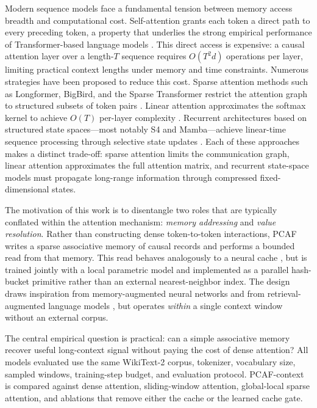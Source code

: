 \documentclass{article}
\begin{document}
Modern sequence models face a fundamental tension between memory access breadth
and computational cost. Self-attention grants each token a direct path to every
preceding token, a property that underlies the strong empirical performance of
Transformer-based language models
\citep{vaswani2017attention,bahdanau2015attention}. This direct access is
expensive: a causal attention layer over a length-$T$ sequence requires
$O(T^2 d)$ operations per layer, limiting practical context lengths under
memory and time constraints. Numerous strategies have been proposed to reduce
this cost. Sparse attention methods such as Longformer, BigBird, and the Sparse
Transformer restrict the attention graph to structured subsets of token pairs
\citep{beltagy2020longformer,zaheer2020bigbird,child2019sparsetransformer}.
Linear attention approximates the softmax kernel to achieve $O(T)$ per-layer
complexity \citep{katharopoulos2020linearattn}. Recurrent architectures based
on structured state spaces—most notably S4 and Mamba—achieve linear-time
sequence processing through selective state updates
\citep{gu2021s4,gu2023mamba}. Each of these approaches makes a distinct
trade-off: sparse attention limits the communication graph, linear attention
approximates the full attention matrix, and recurrent state-space models must
propagate long-range information through compressed fixed-dimensional states.

The motivation of this work is to disentangle two roles that are typically
conflated within the attention mechanism: \emph{memory addressing} and
\emph{value resolution}. Rather than constructing dense token-to-token
interactions, PCAF writes a sparse associative memory of causal records and
performs a bounded read from that memory. This read behaves analogously to a
neural cache \citep{grave2016continuous,khandelwal2019knn}, but is trained
jointly with a local parametric model and implemented as a parallel hash-bucket
primitive rather than an external nearest-neighbor index. The design draws
inspiration from memory-augmented neural networks
\citep{weston2015memory,sukhbaatar2015end2end} and from retrieval-augmented
language models \citep{borgeaud2022retro,izacard2022atlas}, but operates
\emph{within} a single context window without an external corpus.

The central empirical question is practical: can a simple associative memory
recover useful long-context signal without paying the cost of dense attention?
All models evaluated use the same WikiText-2 corpus, tokenizer, vocabulary
size, sampled windows, training-step budget, and evaluation protocol.
PCAF-context is compared against dense attention, sliding-window attention,
global-local sparse attention, and ablations that remove either the cache or
the learned cache gate.
\end{document}

